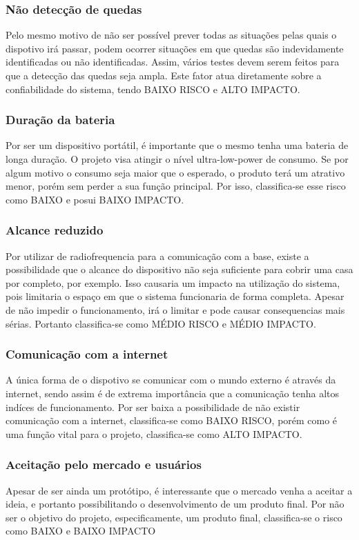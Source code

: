 \documentclass[a4paper]{article}
\begin{document}
\subsubsection{Não detecção de quedas}
Pelo mesmo motivo de não ser possível prever todas as situações pelas quais o dispotivo irá passar, podem ocorrer situações em que quedas são indevidamente identificadas ou não identificadas. Assim, vários testes devem serem feitos para que a detecção das quedas seja ampla. Este fator atua diretamente sobre a confiabilidade do sistema, tendo BAIXO RISCO e ALTO IMPACTO.
\subsubsection{Duração da bateria}
Por ser um dispositivo portátil, é importante que o mesmo tenha uma bateria de longa duração. O projeto visa atingir o nível ultra-low-power de consumo. Se por algum motivo o consumo seja maior que o esperado, o produto terá um atrativo menor, porém sem perder a sua função principal. Por isso, classifica-se esse risco como BAIXO e posui BAIXO IMPACTO.
\subsubsection{Alcance reduzido}
Por utilizar de radiofrequencia para a comunicação com a base, existe a possibilidade que o alcance do dispositivo não seja suficiente para cobrir uma casa por completo, por exemplo. Isso causaria um impacto na utilização do sistema, pois limitaria o espaço em que o sistema funcionaria de forma completa. Apesar de não impedir o funcionamento, irá o limitar e pode causar consequencias mais sérias. Portanto classifica-se como MÉDIO RISCO e MÉDIO IMPACTO.
\subsubsection{Comunicação com a internet}
A única forma de o dispotivo se comunicar com o mundo externo é através da internet, sendo assim é de extrema importância que a comunicação tenha altos indíces de funcionamento. Por ser baixa a possibilidade de não existir comunicação com a internet, classifica-se como BAIXO RISCO, porém como é uma função vital para o projeto, classifica-se como ALTO IMPACTO.
\subsubsection{Aceitação pelo mercado e usuários}
Apesar de ser ainda um protótipo, é interessante que o mercado venha a aceitar a ideia, e portanto possibilitando o desenvolvimento de um produto final. Por não ser o objetivo do projeto, especificamente, um produto final, classifica-se o risco como BAIXO e BAIXO IMPACTO
\end{document}
